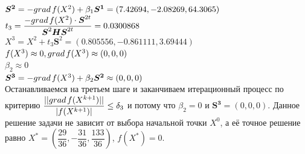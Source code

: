 \documentclass[14pt,a4paper,fleqn]{extarticle}
\begin{document}
	$\boldsymbol{S^{2}} = -grad\hspace*{0.05cm}f(X^2) + \beta_1\boldsymbol{S^{1}} = (7.42694, -2.08269, 64.3065)$\\
	
	$t_3 = \dfrac{-grad\hspace*{0.05cm}f(X^2) \cdot \boldsymbol{S}^{2t}}{\boldsymbol{S}^2\boldsymbol{H}\boldsymbol{S}^{2t}} = 0.0300868$\\
	
	$X^3 = X^2 + t_3\boldsymbol{S}^{2} = (0.805556, -0.861111, 3.69444)$\\
	
	$f(X^3) \approx 0, grad\hspace*{0.05cm}f(X^3) \approx (0, 0, 0)$\\
	
	$\beta_2 \approx 0$\\
	
	$\boldsymbol{S^{3}} = -grad\hspace*{0.05cm}f(X^3) + \beta_2\boldsymbol{S^{2}} \approx (0,0,0)$\\
	
	Останавливаемся на третьем шаге и заканчиваем итерационный процесс по критерию $\dfrac{||grad\hspace*{0.05cm}f(X^{k+1})||}{|f(X^{k+1})|} \leq \delta_3$ и потому что $\beta_2 = 0$ и $\boldsymbol{S^{3}} = (0,0,0)$. Данное решение задачи не зависит от выбора начальной точки $X^0$, а её точное решение равно $X^* = (\dfrac{29}{36}, -\dfrac{31}{36}, \dfrac{133}{36})$, $f(X^*) = 0$.
\end{document}
